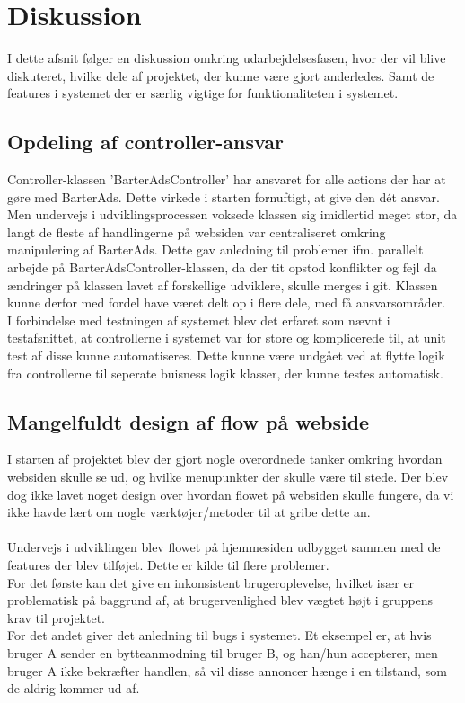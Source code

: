 \chapter{Diskussion}
I dette afsnit følger en diskussion omkring udarbejdelsesfasen, hvor der vil blive diskuteret, hvilke dele af projektet, der kunne være gjort anderledes. Samt de features i systemet der er særlig vigtige for funktionaliteten i systemet.

\section{Opdeling af controller-ansvar}
Controller-klassen 'BarterAdsController' har ansvaret for alle actions der har at gøre med BarterAds. Dette virkede i starten fornuftigt, at give den dét ansvar. Men undervejs i udviklingsprocessen voksede klassen sig imidlertid meget stor, da langt de fleste af handlingerne på websiden var centraliseret omkring manipulering af BarterAds. Dette gav anledning til problemer ifm. parallelt arbejde på BarterAdsController-klassen, da der tit opstod konflikter og fejl da ændringer på klassen lavet af forskellige udviklere, skulle merges i git. Klassen kunne derfor med fordel have været delt op i flere dele, med få ansvarsområder. \\
I forbindelse med testningen af systemet blev det erfaret som nævnt i testafsnittet, at controllerne i systemet var for store og komplicerede til, at unit test af disse kunne automatiseres. Dette kunne være undgået ved at flytte logik fra controllerne til seperate buisness logik klasser, der kunne testes automatisk.

\section{Mangelfuldt design af flow på webside}
I starten af projektet blev der gjort nogle overordnede tanker omkring hvordan websiden skulle se ud, og hvilke menupunkter der skulle være til stede. Der blev dog ikke lavet noget design over hvordan flowet på websiden skulle fungere, da vi ikke havde lært om nogle værktøjer/metoder til at gribe dette an. \\ \\
Undervejs i udviklingen blev flowet på hjemmesiden udbygget sammen med de features der blev tilføjet. Dette er kilde til flere problemer. \\
For det første kan det give en inkonsistent brugeroplevelse, hvilket især er problematisk på baggrund af, at brugervenlighed blev vægtet højt i gruppens krav til projektet. \\
For det andet giver det anledning til bugs i systemet. Et eksempel er, at hvis bruger A sender en bytteanmodning til bruger B, og han/hun accepterer, men bruger A ikke bekræfter handlen, så vil disse annoncer hænge i en tilstand, som de aldrig kommer ud af.\\


